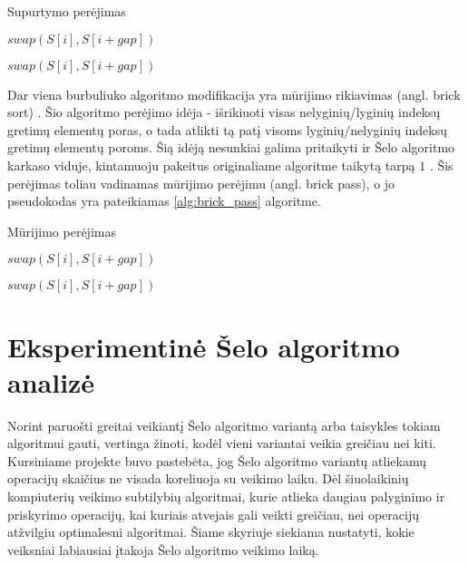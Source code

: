 \documentclass{VUMIFInfBakalaurinis}
\begin{document}
\begin{algorithm}[H]
  \caption{Supurtymo perėjimas}\label{alg:shake_pass}
  \begin{algorithmic}[1]
        \State $swap(S[i], S[i+gap])$
      \EndIf
    \EndFor

        \State $swap(S[i], S[i+gap])$
      \EndIf
    \EndFor
  \end{algorithmic}
\end{algorithm}

Dar viena burbuliuko algoritmo modifikacija yra mūrijimo rikiavimas (angl. brick sort) \cite{habermann1972parallel}.
Šio algoritmo perėjimo idėja - išrikiuoti visas nelyginių/lyginių indeksų gretimų elementų poras,
o tada atlikti tą patį visoms lyginių/nelyginių indeksų gretimų elementų poroms.
Šią idėją nesunkiai galima pritaikyti ir Šelo algoritmo karkaso viduje, kintamuoju pakeitus originaliame algoritme taikytą tarpą $1$ \cite{lemke1994performance}.
Šis perėjimas toliau vadinamas mūrijimo perėjimu (angl. brick pass), o jo pseudokodas yra pateikiamas \ref{alg:brick_pass} algoritme.

\begin{algorithm}[H]
  \caption{Mūrijimo perėjimas}\label{alg:brick_pass}
  \begin{algorithmic}[1]
        \State $swap(S[i], S[i+gap])$
      \EndIf
    \EndFor

        \State $swap(S[i], S[i+gap])$
      \EndIf
    \EndFor
  \end{algorithmic}
\end{algorithm}

\section{Eksperimentinė Šelo algoritmo analizė}

Norint paruošti greitai veikiantį Šelo algoritmo variantą arba taisykles tokiam algoritmui gauti, vertinga žinoti, kodėl vieni variantai veikia greičiau nei kiti.
Kursiniame projekte buvo pastebėta, jog Šelo algoritmo variantų atliekamų operacijų skaičius ne visada koreliuoja su veikimo laiku.
Dėl šiuolaikinių kompiuterių veikimo subtilybių algoritmai, kurie atlieka daugiau palyginimo ir priskyrimo operacijų,
kai kuriais atvejais gali veikti greičiau, nei operacijų atžvilgiu optimalesni algoritmai.
Šiame skyriuje siekiama nustatyti, kokie veiksniai labiausiai įtakoja Šelo algoritmo veikimo laiką.
\end{document}
